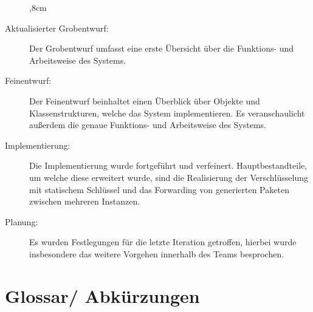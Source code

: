 \documentclass[a4paper, 11pt, ngerman, fleqn]{article}
\begin{document}
\begin{description}
	,8cm
	\item[Aktualisierter Grobentwurf:] Der Grobentwurf umfasst eine erste Übersicht über die Funktions- und Arbeitsweise des Systems.
	
	\item[Feinentwurf:] Der Feinentwurf beinhaltet einen Überblick über Objekte und Klassenstrukturen, welche das System implementieren.
	Es veranschaulicht außerdem die genaue Funktions- und Arbeitsweise des Systems.
	
	\item[Implementierung:] Die Implementierung wurde fortgeführt und verfeinert.
	Hauptbestandteile, um welche diese erweitert wurde, sind die Realisierung der Verschlüsselung mit statischem Schlüssel und das Forwarding von generierten Paketen zwischen mehreren Instanzen.
	
	\item[Planung:] Es wurden Festlegungen für die letzte Iteration getroffen, hierbei wurde insbesondere das weitere Vorgehen innerhalb des Teams besprochen.
	
\end{description}

\clearpage


\section{Glossar/ Abkürzungen}
\end{document}
